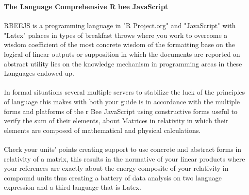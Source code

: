 \documentclass[a4paper,11pt]{article}
\begin{document}

\textbf{The Language Comprehensive R bee JavaScript}
\\\\
RBEEJS is a programming language in "R Project.org" and "JavaScript" with "Latex" palaces in types of breakfast throws where you work to overcome a wisdom coefficient of the most concrete wisdom of the formatting base on the logical of linear outputs or supposition in which the documents are reported on abstract utility lies on the knowledge mechanism in programming areas in these Languages endowed up.
\\\\
In formal situations several multiple servers to stabilize the luck of the principles of language this makes with both your guide is in accordance with the multiple forms and platforms of the r Bee JavaScript using constructive forms useful to verify the sum of their elements, about Matrices in relativity in which their elements are composed of mathematical and physical calculations.
\\\\
Check your units' points creating support to use concrete and abstract forms in relativity of a matrix, this results in the normative of your linear products where your references are exactly about the energy composite of your relativity in compound units thus creating a battery of data analysis on two language expression and a third language that is Latex.
\end{document}
